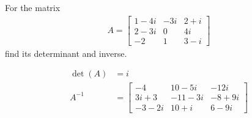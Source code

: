 \begin{Exercise}
For the matrix
\begin{align*}
A=
\begin{bmatrix}
1-4i&-3i&2+i\\ 
2-3i&0&4i\\ 
-2&1&3-i
\end{bmatrix}    
\end{align*}
find its determinant and inverse.
\end{Exercise}
\begin{Answer}
\begin{align*}
\det(A) &= i \\
A^{-1} &= 
\begin{bmatrix}
-4&10-5i&-12i\\ 
3i+3&-11-3i&-8+9i\\ 
-3-2i&10+i&6-9i
\end{bmatrix}
\end{align*}    
\end{Answer}

